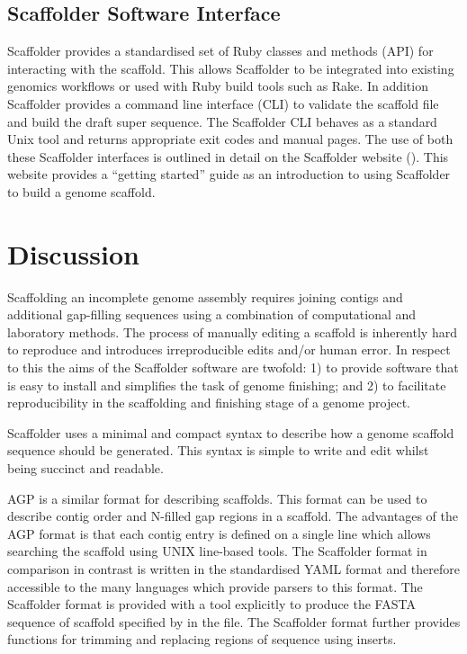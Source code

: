 \documentclass[10pt]{bmc_article}
\newenvironment{bmcformat}{\begin{raggedright}\baselineskip20pt\sloppy\setboolean{publ}{false}}{\end{raggedright}\baselineskip20pt\sloppy}
\begin{document}
\begin{bmcformat}
\subsection*{Scaffolder Software Interface} %

Scaffolder provides a standardised set of Ruby classes and methods (API) for
interacting with the scaffold. This allows Scaffolder to be integrated into
existing genomics workflows or used with Ruby build tools such as Rake. In
addition Scaffolder provides a command line interface (CLI) to validate the
scaffold file and build the draft super sequence. The Scaffolder CLI behaves as
a standard Unix tool and returns appropriate exit codes and manual pages. The
use of both these Scaffolder interfaces is outlined in detail on the Scaffolder
website (\scaffolder). This website provides a ``getting started'' guide as an
introduction to using Scaffolder to build a genome scaffold. \pb

\clearpage

\section*{Discussion} %

Scaffolding an incomplete genome assembly requires joining contigs and
additional gap-filling sequences using a combination of computational and
laboratory methods. The process of manually editing a scaffold is inherently
hard to reproduce and introduces irreproducible edits and/or human error. In
respect to this the aims of the Scaffolder software are twofold: 1) to provide
software that is easy to install and simplifies the task of genome finishing;
and 2) to facilitate reproducibility in the scaffolding and finishing stage of
a genome project. \pb

Scaffolder uses a minimal and compact syntax to describe how a genome scaffold
sequence should be generated. This syntax is simple to write and edit whilst
being succinct and readable. \pb

AGP is a similar format for describing scaffolds. This format can be used to
describe contig order and N-filled gap regions in a scaffold. The advantages of
the AGP format is that each contig entry is defined on a single line which
allows searching the scaffold using UNIX line-based tools. The Scaffolder
format in comparison in contrast is written in the standardised YAML format and
therefore accessible to the many languages which provide parsers to this
format. The Scaffolder format is provided with a tool explicitly to produce the
FASTA sequence of scaffold specified by in the file. The Scaffolder format
further provides functions for trimming and replacing regions of sequence using
inserts. \pb


\end{bmcformat}
\end{document}
